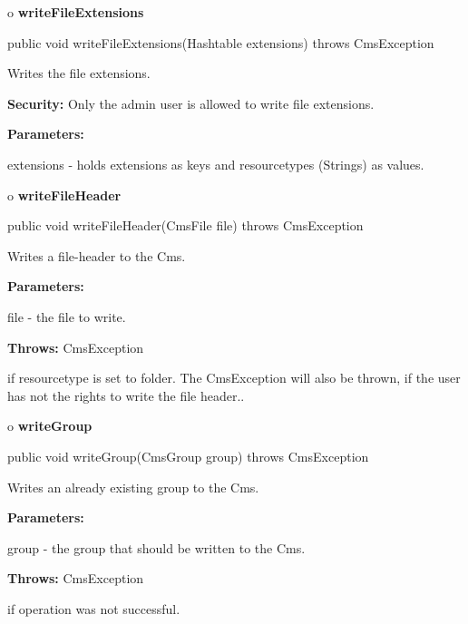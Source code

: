 o {\bf writeFileExtensions} 

\begin{PRE}
 public void writeFileExtensions(Hashtable extensions) throws CmsException
\end{PRE}

\begin{description}
\htmlDD Writes the file extensions. 

{\bf Security:} Only the admin user is allowed to write file extensions. 

\begin{description}
\item {\bf Parameters:}  

extensions - holds extensions as keys and resourcetypes (Strings) as values.  
\end{description}

\end{description}

o {\bf writeFileHeader} 

\begin{PRE}
 public void writeFileHeader(CmsFile file) throws CmsException
\end{PRE}

\begin{description}
\htmlDD Writes a file-header to the Cms. 

\begin{description}
\item {\bf Parameters:}  

file - the file to write.  
\item {\bf Throws:} CmsException  

if resourcetype is set to folder. The CmsException will also be thrown, if the
user has not the rights to write the file header..  
\end{description}

\end{description}

o {\bf writeGroup} 

\begin{PRE}
 public void writeGroup(CmsGroup group) throws CmsException
\end{PRE}

\begin{description}
\htmlDD Writes an already existing group to the Cms. 

\begin{description}
\item {\bf Parameters:}  

group - the group that should be written to the Cms.  
\item {\bf Throws:} CmsException  

if operation was not successful.  
\end{description}

\end{description}

